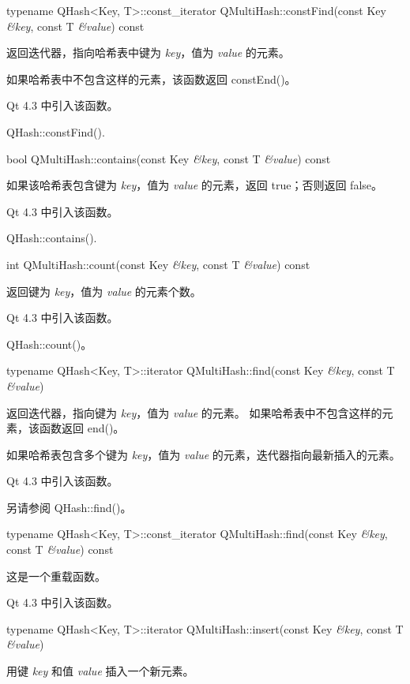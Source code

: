 typename QHash<Key, T>::const\_iterator QMultiHash::constFind(const Key \emph{\&key}, const T \emph{\&value}) const

返回迭代器，指向哈希表中键为 \emph{key}，值为 \emph{value} 的元素。

如果哈希表中不包含这样的元素，该函数返回 constEnd()。

Qt 4.3 中引入该函数。

\begin{seeAlso}
QHash::constFind().
\end{seeAlso}

bool QMultiHash::contains(const Key \emph{\&key}, const T \emph{\&value}) const

如果该哈希表包含键为 \emph{key}，值为 \emph{value} 的元素，返回 true；否则返回 false。

Qt 4.3 中引入该函数。

\begin{seeAlso}
QHash::contains().
\end{seeAlso}

int QMultiHash::count(const Key \emph{\&key}, const T \emph{\&value}) const

返回键为 \emph{key}，值为 \emph{value} 的元素个数。

Qt 4.3 中引入该函数。

\begin{seeAlso}
QHash::count()。
\end{seeAlso}

typename QHash<Key, T>::iterator QMultiHash::find(const Key \emph{\&key}, const T \emph{\&value})

返回迭代器，指向键为 \emph{key}，值为 \emph{value} 的元素。
如果哈希表中不包含这样的元素，该函数返回 end()。

如果哈希表包含多个键为  \emph{key}，值为 \emph{value} 的元素，迭代器指向最新插入的元素。

Qt 4.3 中引入该函数。

\begin{seeAlso}
另请参阅 QHash::find()。
\end{seeAlso}

typename QHash<Key, T>::const\_iterator QMultiHash::find(const Key \emph{\&key}, const T \emph{\&value}) const

这是一个重载函数。

Qt 4.3 中引入该函数。

typename QHash<Key, T>::iterator QMultiHash::insert(const Key \emph{\&key}, const T \emph{\&value})

用键 \emph{key} 和值 \emph{value} 插入一个新元素。

